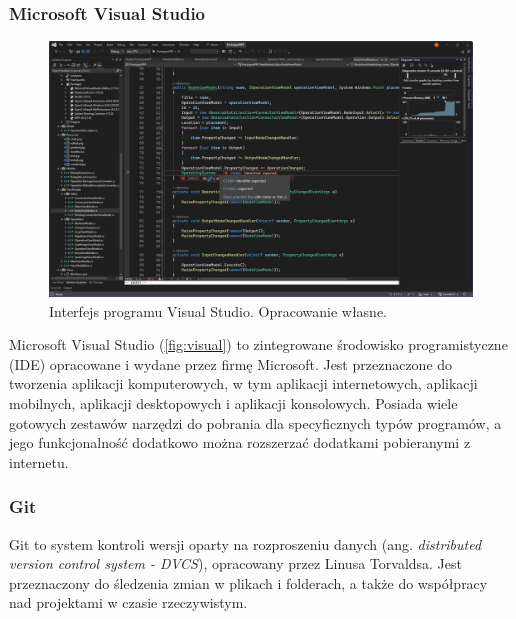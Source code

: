\subsubsection{Microsoft Visual Studio}
\begin{figure}[H]
    \centering
    \includegraphics[width=1\linewidth]{./images/Picture10.jpg}
    \caption{Interfejs programu Visual Studio. Opracowanie własne.}
    \label{fig:visual}
\end{figure}

Microsoft Visual Studio \cite{visualstudio} (\autoref{fig:visual}) to zintegrowane środowisko programistyczne (IDE) opracowane i wydane przez firmę Microsoft. Jest przeznaczone do tworzenia aplikacji komputerowych, w tym aplikacji internetowych, aplikacji mobilnych, aplikacji desktopowych i aplikacji konsolowych. Posiada wiele gotowych zestawów narzędzi do pobrania dla specyficznych typów programów, a jego funkcjonalność dodatkowo można rozszerzać dodatkami pobieranymi z internetu.

\subsubsection{Git}

Git \cite{git} to system kontroli wersji oparty na rozproszeniu danych (ang. \textit{distributed version control system - DVCS}), opracowany przez Linusa Torvaldsa. 
Jest przeznaczony do śledzenia zmian w plikach i folderach, a także do współpracy nad projektami w czasie rzeczywistym. 